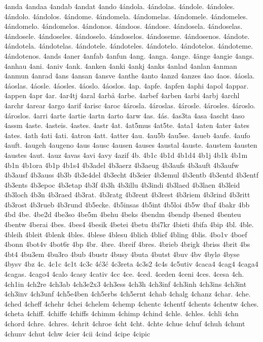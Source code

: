 4anda
4andaa
4andab
4andat
4ando
4ándola.
4ándolas.
4ándole.
4ándoles.
4ándolo.
4ándolos.
4ándome.
4ándomela.
4ándomelas.
4ándomele.
4ándomeles.
4ándomelo.
4ándomelos.
4ándonos.
4ándoos.
4ándose.
4ándosela.
4ándoselas.
4ándosele.
4ándoseles.
4ándoselo.
4ándoselos.
4ándoseme.
4ándosenos.
4ándote.
4ándotela.
4ándotelas.
4ándotele.
4ándoteles.
4ándotelo.
4ándotelos.
4ándoteme.
4ándotenos.
4ands
4aner
4anfab
4anfun
4ang.
4anga.
4ange.
4änge
4angie
4angs.
4anhau
4ani.
4aniv
4ank.
4anken
4anki
4ankj
4anks
4anlad
4anlan
4anman
4anmun
4anrad
4ans
4ansan
4ansve
4anthe
4anto
4anzd
4anzes
4ao
4aos.
4áosla.
4áoslas.
4áosle.
4áosles.
4áoslo.
4áoslos.
4ap.
4apfe.
4apfen
4aphi
4apol
4appar.
4appen
4apr
4ar.
4ar4tj
4aral
4arbå
4arbe.
4arbef
4arben
4arbi
4arbj
4archl
4archr
4arear
4argo
4arif
4arisc
4aroc
4árosla.
4ároslas.
4árosle.
4árosles.
4ároslo.
4ároslos.
4arri
4arte
4artie
4artn
4arto
4arw
4as.
4ás.
4as3ta
4asa
4ascht
4aso
4assm
4aste.
4asteis.
4astes.
4astr
4at.
4at5mus
4at5te.
4ata1
4aten
4ater
4ates
4ates.
4ath
4ati
4ati.
4atron
4att.
4atter
4au.
4au5b
4au5se.
4aueb
4aufe.
4aufo
4auft.
4augeh
4augeno
4aus
4ausc
4ausen
4auses
4austal
4auste.
4austem
4austen
4austes
4aut.
4auz
4avas
4avi
4avy
4azif
4b.
4b1c
4b1d
4b1d4
4b1j
4b1k
4b1m
4b1n
4b1ora
4b1p
4b1s4
4b3adel
4b3aerz
4b3aeug
4b3aufs
4b3auft
4b3aufw
4b3ausf
4b3auss
4b3b
4b3e4del
4b3echt
4b3eier
4b3emul
4b3entb
4b3entd
4b3entf
4b3ents
4b3epoc
4b3etap
4b3f
4b3h
4b3illu
4b3indi
4b3laed
4b3laen
4b3leid
4b3loch
4b3n
4b3raed
4b3rat.
4b3ratg
4b3rent
4b3rest
4b3riem
4b3rind
4b3ritt
4b3rost
4b3rueb
4b3rund
4b5ecke.
4b5insas
4b5int
4b5loi
4b5w
4baf
4bakr
4bb
4bd
4be.
4be2d
4be3so
4be5m
4behu
4beks
4bendm
4bendp
4bened
4benteu
4bentw
4berai
4bes.
4bes4
4besik
4betei
4betu
4bi7kr
4bieti
4bifa
4bip
4bl.
4ble.
4bleih
4bleit
4blenk
4bles.
4blese
4blesu
4blich
4blief
4bling
4blis.
4bo1v
4boef
4bonn
4bot4v
4bot6r
4bp
4br.
4bre.
4breif
4bres.
4brieb
4brigk
4briss
4brit
4bs
4bt4
4bu3em
4bu3ro
4bub
4bustr
4busy
4buta
4butst
4buv
4bv
4bylø
4byse
4bysv
4bz
4c.
4c1c
4c1t
4c3c
4ć3ć
4c3reta
4c3s2
4c4s
4c5utiv
4caca4
4cag4
4caga4
4cagas.
4cago4
4calo
4casy
4cativ
4cc
4ce.
4ced.
4ceden
4ceni
4ces.
4cesa
4ch.
4ch1in
4ch2re
4ch3ab
4ch3e2x3
4ch3ess
4ch3h
4ch3inf
4ch3inh
4ch3ins
4ch3int
4ch3inv
4ch3unf
4ch5e4ben
4ch5erbs
4ch5ernt
4chab
4chalg
4chanz
4char.
4che.
4ched
4cheff
4chehr
4chei
4chelem
4chemp
4chentc
4chentf
4chents
4chentw
4ches.
4cheta
4chiff.
4chiffe
4chiffs
4chimm
4chimp
4chind
4chle.
4chles.
4chli
4chn
4chord
4chre.
4chres.
4chrit
4chroe
4cht
4cht.
4chte
4chue
4chuf
4chuh
4chunt
4chunv
4chut
4chw
4cier
4cii
4cind
4cipe
4cipic
